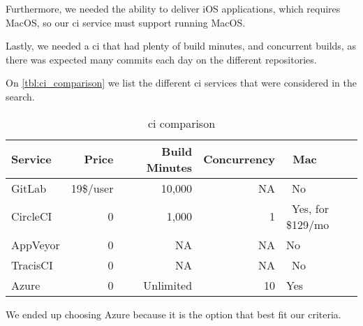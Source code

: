 Furthermore, we needed the ability to deliver iOS applications, which requires MacOS, so our \gls{ci} service must support running MacOS. 

Lastly, we needed a \gls{ci} that had plenty of build minutes, and concurrent builds, as there was expected many commits each day on the different repositories.

On \autoref{tbl:ci_comparison} we list the different \gls{ci} services that were considered in the search. 

\noindent\begin{longtable}[]{@{}lrrrl@{}}
    \caption{\gls{ci} comparison}
    \label{tbl:ci_comparison}\\
    \toprule
    Service & Price & ~Build Minutes & Concurrency & ~Mac\tabularnewline
    \midrule
    \endhead
    GitLab & 19\$/user & 10,000 & NA & ~No\tabularnewline
    CircleCI & 0 & 1,000 & 1 & ~Yes, for \$129/mo\tabularnewline
    AppVeyor & 0 & ~ NA & NA & No\tabularnewline
    TracisCI & ~ 0 & ~ NA & ~ NA & ~No ~\tabularnewline
    Azure & 0 & ~ Unlimited & ~10 & Yes\tabularnewline
    \bottomrule
\end{longtable}

We ended up choosing Azure because it is the option that best fit our criteria. 
